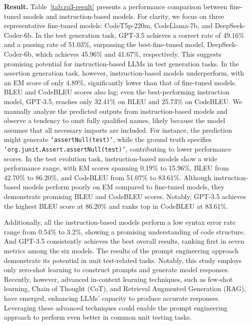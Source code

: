 

\textbf{Result.}
Table~\ref{tab:rq3-result} presents a performance comparison between fine-tuned models and instruction-based models. For clarity, we focus on three representative fine-tuned models: CodeT5p-220m, CodeLlama-7b, and DeepSeek-Coder-6b.
In the test generation task, GPT-3.5 achieves a correct rate of 49.16\% and a passing rate of 51.03\%, surpassing the best-fine-tuned model, DeepSeek-Coder-6b, which achieves 45.96\% and 41.67\%, respectively. This suggests promising potential for instruction-based LLMs in test generation tasks.
In the assertion generation task, however, instruction-based models underperform, with an EM score of only 4.89\%, significantly lower than that of fine-tuned models. BLEU and CodeBLEU scores also lag; even the best-performing instruction model, GPT-3.5, reaches only 32.41\% on BLEU and 25.73\% on CodeBLEU. We manually analyze the predicted outputs from instruction-based models and observe a tendency to omit fully qualified names, likely because the model assumes that all necessary imports are included.  For instance, the prediction might generate \texttt{`assertNull(test)'}, while the ground truth specifies \texttt{`org.junit.Assert.assertNull(test)'}, contributing to lower performance scores.
In the test evolution task, instruction-based models show a wide performance range, with EM scores spanning 0.19\% to 15.96\%, BLEU from 42.70\% to 86.20\%, and CodeBLEU from 51.07\% to 83.61\%. Although instruction-based models perform poorly on EM compared to fine-tuned models, they demonstrate promising BLEU and CodeBLEU scores. Notably, GPT-3.5 achieves the highest BLEU score at 86.20\% and ranks top in CodeBLEU at 83.61\%.

Additionally, all the instruction-based models perform a low syntax error rate range from 0.54\% to 3.2\%, showing a promising understanding of code structure. And GPT-3.5 consistently achieves the best overall results, ranking first in seven metrics among the six models. 
The results of the prompt engineering approach demonstrate its potential in unit test-related tasks. Notably, this study employs only zero-shot learning to construct prompts and generate model responses. Recently, however, advanced in-context learning techniques, such as few-shot learning, Chain of Thought (CoT), and Retrieval Augmented Generation (RAG), have emerged, enhancing LLMs’ capacity to produce accurate responses. Leveraging these advanced techniques could enable the prompt engineering approach to perform even better in common unit testing tasks.

